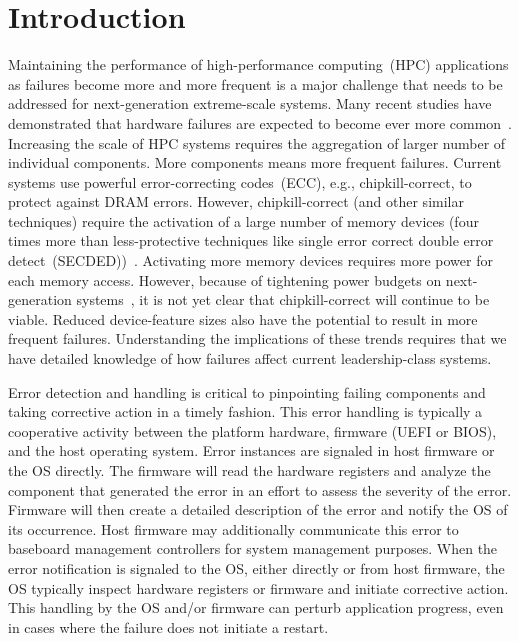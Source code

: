 
\section{Introduction}
\label{sec:intro}


Maintaining the performance of high-performance computing~(HPC) applications as
failures become more and more frequent is a major challenge that needs to be
addressed for next-generation extreme-scale systems.  Many recent studies have
demonstrated that hardware failures are expected to become ever more
common~\cite{Bergman08exascalecomputing}.  Increasing the scale of HPC systems
requires the aggregation of larger number of individual components.  More
components means more frequent failures.  Current systems use powerful
error-correcting codes~(ECC), e.g., chipkill-correct, to protect against DRAM
errors.  However, chipkill-correct (and other similar techniques) require the
activation of a large number of memory devices (four times more than
less-protective techniques like single error correct double error
detect~(SECDED))~\cite{Jian13}.  Activating more memory devices requires more
power for each memory access.  However, because of tightening power budgets on
next-generation systems~\cite{Bergman08exascalecomputing}, it is not yet clear
that chipkill-correct will continue to be viable.  Reduced device-feature sizes
also have the potential to result in more frequent failures.  Understanding the
implications of these trends requires that we have detailed knowledge of how
failures affect current leadership-class systems.

Error detection and handling is critical to pinpointing failing components and
taking corrective action in a timely fashion. This error handling is typically a
cooperative activity between the platform hardware, firmware (UEFI or BIOS), and
the host operating system.  Error instances are signaled in host firmware or
the OS directly. The firmware will read the hardware registers and analyze the
component that generated the error in an effort to assess the severity of the
error. Firmware will then create a detailed description of the error and notify
the OS of its occurrence. Host firmware may additionally communicate this error
to baseboard management controllers for system management purposes.  When the
error notification is signaled to the OS, either directly or from host
firmware, the OS typically inspect hardware registers or firmware and initiate
corrective action.  This handling by the OS and/or firmware can perturb
application progress, even in cases where the failure does not initiate a
restart.

